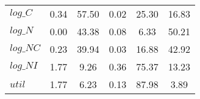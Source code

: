 \begin{center}
\begin{longtable}{lccccc}
$log\_C          $	 & 	        0.34	 & 	       57.50	 & 	        0.02	 & 	       25.30	 & 	       16.83 \\ 
$log\_N          $	 & 	        0.00	 & 	       43.38	 & 	        0.08	 & 	        6.33	 & 	       50.21 \\ 
$log\_NC         $	 & 	        0.23	 & 	       39.94	 & 	        0.03	 & 	       16.88	 & 	       42.92 \\ 
$log\_NI         $	 & 	        1.77	 & 	        9.26	 & 	        0.36	 & 	       75.37	 & 	       13.23 \\ 
${util}          $	 & 	        1.77	 & 	        6.23	 & 	        0.13	 & 	       87.98	 & 	        3.89 \\ 
\end{longtable}
 \end{center}
